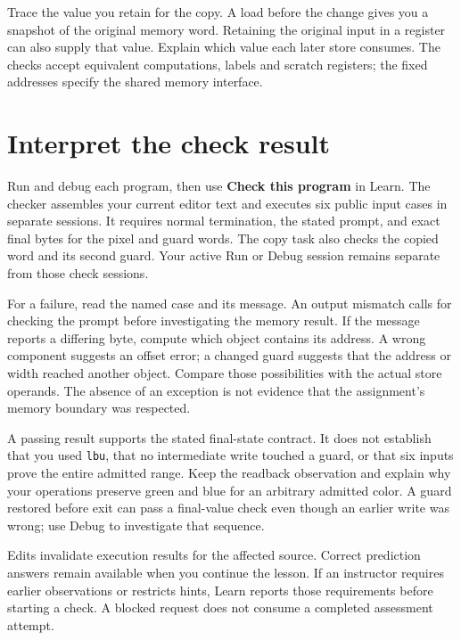 Trace the value you retain for the copy. A load before the change gives you a
snapshot of the original memory word. Retaining the original input in a register
can also supply that value. Explain which value each later store consumes. The
checks accept equivalent computations, labels and scratch registers; the fixed
addresses specify the shared memory interface.

\section{Interpret the check result}

Run and debug each program, then use \textbf{Check this program} in Learn.
The checker assembles your current editor text and executes six public input
cases in separate sessions. It requires normal termination, the stated prompt,
and exact final bytes for the pixel and guard words. The copy task also checks
the copied word and its second guard. Your active Run or Debug session remains
separate from those check sessions.

For a failure, read the named case and its message. An output mismatch calls for
checking the prompt before investigating the memory result. If the message reports
a differing byte, compute which object contains its address. A wrong component suggests an offset
error; a changed guard suggests that the address or width reached another object.
Compare those possibilities with the actual store operands. The absence of an
exception is not evidence that the assignment's memory boundary was respected.

A passing result supports the stated final-state contract. It does not establish
that you used \texttt{lbu}, that no intermediate write touched a guard, or that
six inputs prove the entire admitted range. Keep the readback observation and
explain why your operations preserve green and blue for an arbitrary admitted
color. A guard restored before exit can pass a final-value check even though an
earlier write was wrong; use Debug to investigate that sequence.

Edits invalidate execution results for the affected source. Correct prediction
answers remain available when you continue the lesson. If an instructor requires
earlier observations or restricts hints, Learn reports those requirements before
starting a check. A blocked request does not consume a completed assessment attempt.
